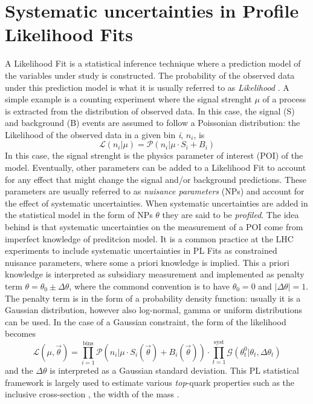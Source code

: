 \documentclass[12pt]{article}
\begin{document}
\section{Systematic uncertainties in Profile Likelihood Fits}
A Likelihood Fit is a statistical inference technique where a prediction model of the variables under study is constructed. The probability of the observed data under this prediction model is what it is usually referred to as \emph{Likelihood} \cite{kCranmer}.
A simple example is a counting experiment where the signal strenght $\mu$ of a process is extracted from the distribution of observed data. In this case, the signal (S) and background (B) events are assumed to follow a Poissonian distribution: the Likelihood of the observed data in a given bin \emph{i}, $n_i$, is
\begin{equation}
\mathcal{L}(n_i|\mu) = \mathcal{P}(n_i|\mu\cdot S_i+B_i)
\end{equation}
In this case, the signal strenght is the physics parameter of interest (POI) of the model. Eventually, other parameters can be added to a Likelihood Fit to account for any effect that might change the signal and/or background predictions. 
These parameters are usually referred to as \emph{nuisance parameters} (NPs) and account for the effect of systematic uncertainties. When systematic uncertainties are added in the statistical model in the form of NPs $\theta$ they are said to be \emph{profiled}. The idea behind is that systematic uncertainties on the measurement of a POI come from imperfect knowledge of preditcion model. It is a common practice at the LHC experiments to include systematic uncertainties in PL Fits as constrained nuisance parameters, where some a priori knowledge is implied. This a priori knowledge is interpreted as subsidiary measurement and implemented as penalty term $\theta = \theta_0\pm\Delta\theta$, where the commond convention is to have $\theta_0 = 0$ and $|\Delta\theta| =1$. The penalty term is in the form of a probability density function: usually it is a Gaussian distribution, however also log-normal, gamma or uniform distributions can be used. 
In the case of a Gaussian constraint, the form of the likelihood becomes 
\begin{equation}
\mathcal{L}(\mu,\vec{\theta}) = \displaystyle\prod_{i=1}^{\mathrm{bins}}\mathcal{P}(n_i|\mu\cdot S_i(\vec{\theta})+B_i(\vec{\theta}))\cdot\displaystyle\prod_{t=1}^{\mathrm{syst}}\mathcal{G}(\theta_t^0|\theta_t,\Delta\theta_t)
\end{equation}
and the $\Delta\theta$ is interpreted as a Gaussian standard deviation.
This PL statistical framework is largely used to estimate various \emph{top}-quark properties such as the inclusive cross-section \cite{Aad_2020,CMS_inclusive}, the width \cite{ATLAS:2019onj} of the mass \cite{CMS_inclusive}.
\end{document}
